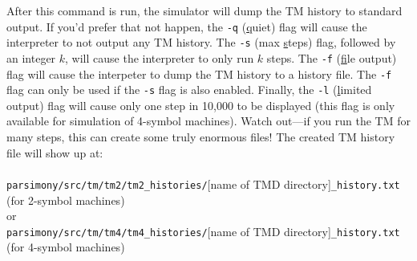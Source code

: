 \documentclass[11pt]{article}
\begin{document}
After this command is run, the simulator will dump the TM history to standard output. If you'd prefer that not happen, the \texttt{-q} (\underline{q}uiet) flag will cause the interpreter to not output any TM history. The \texttt{-s} (max \underline{s}teps) flag, followed by an integer $k$, will cause the interpreter to only run $k$ steps. The \texttt{-f} (\underline{f}ile output) flag will cause the interpeter to dump the TM history to a history file. The \texttt{-f} flag can only be used if the \texttt{-s} flag is also enabled. Finally, the \texttt{-l} (\underline{l}imited output) flag will cause only one step in 10,000 to be displayed (this flag is only available for simulation of 4-symbol machines). Watch out---if you run the TM for many steps, this can create some truly enormous files! The created TM history file will show up at: \\ \\
\texttt{parsimony/src/tm/tm2/tm2_histories/}[name of TMD directory]\texttt{_history.txt} (for 2-symbol machines) \\
or \\
\texttt{parsimony/src/tm/tm4/tm4_histories/}[name of TMD directory]\texttt{_history.txt} (for 4-symbol machines) \\
\end{document}
